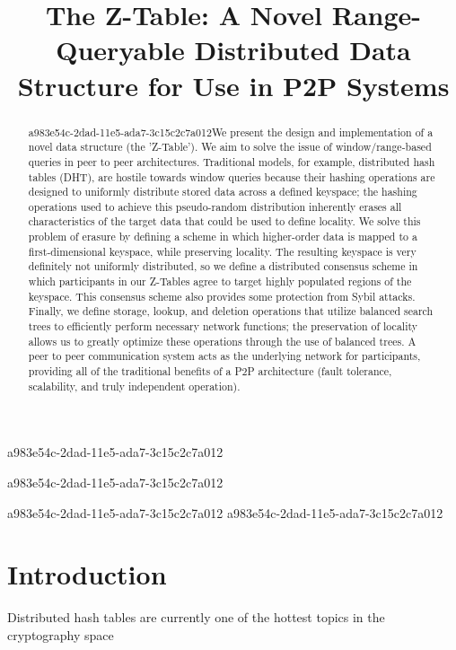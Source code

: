 \documentclass[12pt]{article}
\title{The Z-Table: A Novel Range-Queryable Distributed Data Structure for Use in P2P Systems}
\begin{document}
a983e54c-2dad-11e5-ada7-3c15c2c7a012\maketitle
a983e54c-2dad-11e5-ada7-3c15c2c7a012
\begin{abstract}
a983e54c-2dad-11e5-ada7-3c15c2c7a012We present the design and implementation of a novel data structure (the 'Z-Table'). We aim to solve the issue of window/range-based queries in peer to peer architectures. Traditional models, for example,  distributed hash tables (DHT), are hostile towards window queries because their hashing operations are designed to uniformly distribute stored data across a defined keyspace; the hashing operations used to achieve this pseudo-random distribution inherently erases all characteristics of the target data that could be used to define locality. We solve this problem of erasure by defining a scheme in which higher-order data is mapped to a first-dimensional keyspace, while preserving locality. The resulting keyspace is very definitely not uniformly distributed, so we define a distributed consensus scheme in which participants in our Z-Tables agree to target highly populated regions of the keyspace. This consensus scheme also provides some protection from Sybil attacks. Finally, we define storage, lookup, and deletion operations that utilize balanced search trees to efficiently perform necessary network functions; the preservation of locality allows us to greatly optimize these operations through the use of balanced trees. A peer to peer communication system acts as the underlying network for participants, providing all of the traditional benefits of a P2P architecture (fault tolerance, scalability, and truly independent operation).
\end{abstract}


a983e54c-2dad-11e5-ada7-3c15c2c7a012\newpage
a983e54c-2dad-11e5-ada7-3c15c2c7a012\section{Introduction}
Distributed hash tables are currently one of the hottest topics in the cryptography space~\cite{Stoica:2001dj,Rowstron:2001ea,Ratnasamy:2001wn}

\printbibliography
\end{document}
